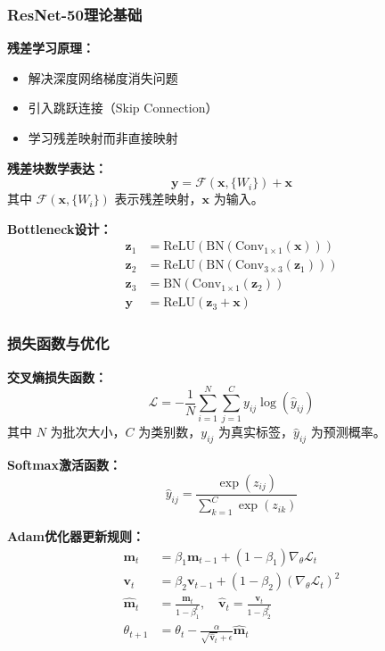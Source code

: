 \documentclass[12pt]{beamer}
\begin{document}
\begin{frame}
\frametitle{ResNet-50理论基础}
\textbf{残差学习原理：}
\begin{itemize}
    \item 解决深度网络梯度消失问题
    \item 引入跳跃连接（Skip Connection）
    \item 学习残差映射而非直接映射
\end{itemize}

\vspace{0.3cm}
\textbf{残差块数学表达：}
\[
\mathbf{y} = \mathcal{F}(\mathbf{x}, \{W_i\}) + \mathbf{x}
\]
其中 \(\mathcal{F}(\mathbf{x}, \{W_i\})\) 表示残差映射，\(\mathbf{x}\) 为输入。

\vspace{0.3cm}
\textbf{Bottleneck设计：}
\[
\begin{aligned}
\mathbf{z}_1 &= \text{ReLU}(\text{BN}(\text{Conv}_{1×1}(\mathbf{x}))) \\
\mathbf{z}_2 &= \text{ReLU}(\text{BN}(\text{Conv}_{3×3}(\mathbf{z}_1))) \\
\mathbf{z}_3 &= \text{BN}(\text{Conv}_{1×1}(\mathbf{z}_2)) \\
\mathbf{y} &= \text{ReLU}(\mathbf{z}_3 + \mathbf{x})
\end{aligned}
\]
\end{frame}

\begin{frame}
\frametitle{损失函数与优化}
\textbf{交叉熵损失函数：}
\[
\mathcal{L} = -\frac{1}{N}\sum_{i=1}^{N}\sum_{j=1}^{C} y_{ij} \log(\hat{y}_{ij})
\]
其中 \(N\) 为批次大小，\(C\) 为类别数，\(y_{ij}\) 为真实标签，\(\hat{y}_{ij}\) 为预测概率。

\vspace{0.3cm}
\textbf{Softmax激活函数：}
\[
\hat{y}_{ij} = \frac{\exp(z_{ij})}{\sum_{k=1}^{C} \exp(z_{ik})}
\]

\vspace{0.3cm}
\textbf{Adam优化器更新规则：}
\[
\begin{aligned}
\mathbf{m}_t &= \beta_1 \mathbf{m}_{t-1} + (1-\beta_1) \nabla_{\theta} \mathcal{L}_t \\
\mathbf{v}_t &= \beta_2 \mathbf{v}_{t-1} + (1-\beta_2) (\nabla_{\theta} \mathcal{L}_t)^2 \\
\hat{\mathbf{m}}_t &= \frac{\mathbf{m}_t}{1-\beta_1^t}, \quad \hat{\mathbf{v}}_t = \frac{\mathbf{v}_t}{1-\beta_2^t} \\
\theta_{t+1} &= \theta_t - \frac{\alpha}{\sqrt{\hat{\mathbf{v}}_t} + \epsilon} \hat{\mathbf{m}}_t
\end{aligned}
\]
\end{frame}
\end{document}
